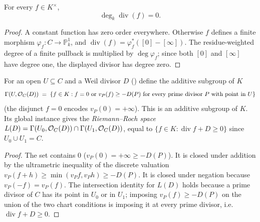 \begin{theorem}
  \label{thm:adelic_principal_degree_zero}
  For every \(f\in K^\times\),
  \[
    \deg_k\operatorname{div}(f)=0.
  \]
\end{theorem}
\begin{proof}
  A constant function has zero order everywhere.  Otherwise \(f\) defines
  a finite morphism \(\varphi_f\colon C\to\mathbb P^1_k\), and
  \(\operatorname{div}(f)=\varphi_f^*([0]-[\infty])\).  The
  residue-weighted degree of a finite pullback is multiplied by
  \(\deg\varphi_f\); since both \([0]\) and \([\infty]\) have degree one,
  the displayed divisor has degree zero.
\end{proof}

\begin{definition}
  \label{def:adelic_sectionOfDivisor}
  \leanok
  For an open \(U \subseteq C\) and a Weil divisor \(D\)
  () define the additive subgroup of \(K\)
  \[
    \Gamma(U, \mathcal{O}_{C}(D)) \;=\;
      \{ f \in K : f = 0 \text{ or } v_P(f) \ge -D(P) \text{ for every
         prime divisor } P \text{ with point in } U\}
  \]
  (the disjunct \(f = 0\) encodes \(v_P(0) = +\infty\)).  This is an
  additive subgroup of \(K\).  Its global instance gives the
  \emph{Riemann--Roch space}
  \(L(D) = \Gamma(U_0, \mathcal{O}_{C}(D)) \cap \Gamma(U_1, \mathcal{O}_{C}(D))\),
  equal to \(\{ f \in K : \operatorname{div} f + D \ge 0\}\) since
  \(U_0 \cup U_1 = C\).
\end{definition}
\begin{proof}
  \leanok
  The set contains \(0\)
  (\(v_P(0) = +\infty \ge -D(P)\)). It is closed under addition by the
  ultrametric inequality of the discrete valuation
  \(v_P(f + h) \ge \min(v_P f, v_P h) \ge -D(P)\). It is closed under
  negation because \(v_P(-f)=v_P(f)\).
  The intersection identity for \(L(D)\) holds because a prime divisor of
  \(C\) has its point in \(U_0\) or in \(U_1\); imposing \(v_P(f) \ge
  -D(P)\) on the union of the two chart conditions is imposing it at
  every prime divisor, i.e.\ \(\operatorname{div} f + D \ge 0\).
\end{proof}


